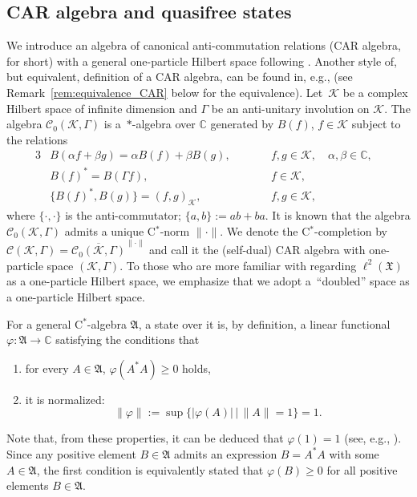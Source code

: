\documentclass[11pt]{article}
\numberwithin{equation}{section}
\numberwithin{equation}{section}
\newcommand{\mfrak}[1]{\mathfrak{#1}}
\newcommand{\mcal}[1]{\mathcal{#1}}
\newcommand{\mbb}[1]{\mathbb{#1}}
\begin{document}
\subsection{CAR algebra and quasifree states}
We introduce an algebra of canonical anti-commutation relations (CAR algebra, for short) with a general one-particle Hilbert space following \cite{Araki1970,Binnenhei1995}.
Another style of, but equivalent, definition of a CAR algebra, can be found in, e.g., \cite{BratteliRobinson1997} (see Remark~\ref{rem:equivalence_CAR} below for the equivalence).
Let~$\mcal{K}$ be a complex Hilbert space of infinite dimension and $\Gamma$ be an anti-unitary involution on $\mcal{K}$.
The algebra $\mcal{C}_{0}(\mcal{K},\Gamma)$ is a~$\ast$-algebra over $\mbb{C}$ generated by $B(f)$, $f\in\mcal{K}$ subject to the relations
\begin{alignat*}{3}
	&B(\alpha f+\beta g)=\alpha B(f)+\beta B(g),\qquad && f, g\in\mcal{K},\quad \alpha,\beta\in\mbb{C},& \\
	&B(f)^{\ast}= B(\Gamma f),\qquad && f\in\mcal{K},&\\
	&\{B(f)^{\ast}, B(g)\}=(f,g)_{\mcal{K}}, \qquad && f,g\in\mcal{K},&
\end{alignat*}
where $\{\cdot,\cdot\}$ is the anti-commutator; $\{a,b\}:=ab+ba$.
It is known that the algebra $\mcal{C}_{0}(\mcal{K},\Gamma)$ admits a unique C$^{\ast}$-norm $\|\cdot\|$. We denote the C$^{\ast}$-completion by $\mcal{C}(\mcal{K},\Gamma)=\overline{\mcal{C}_{0}(\mcal{K},\Gamma)}^{\|\cdot\|}$ and call it the (self-dual) CAR algebra with one-particle space $(\mcal{K},\Gamma)$. To those who are more familiar with regarding $\ell^{2}(\mfrak{X})$ as a one-particle Hilbert space, we emphasize that we adopt a~``doubled'' space as a one-particle Hilbert space.

For a general C$^{\ast}$-algebra $\mfrak{A}$, a state over it is, by definition, a linear functional $\varphi\colon \mfrak{A}\to\mbb{C}$ satisfying the conditions that
\begin{enumerate}\itemsep=0pt
\item[1)] 	for every $A\in\mfrak{A}$, $\varphi (A^{\ast}A)\ge 0$ holds,
\item[2)] 	it is normalized:
		\begin{equation*}
			\|\varphi\|:=\sup\big\{|\varphi (A)|\, \big|\, \|A\|=1\big\}=1.
		\end{equation*}
\end{enumerate}
Note that, from these properties, it can be deduced that $\varphi (1)=1$ (see, e.g., \cite[Chapter~I, Section~9]{Takesaki1979}). Since any positive element $B\in\mfrak{A}$ admits an expression $B=A^{\ast}A$ with some $A\in\mfrak{A}$, the first condition is equivalently stated that $\varphi (B)\ge 0$ for all positive elements $B\in \mfrak{A}$.
\end{document}
